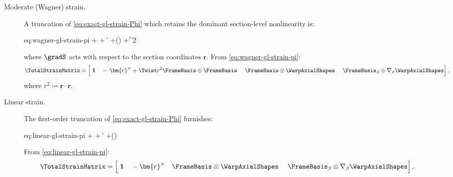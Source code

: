 \begin{description}
\item[Moderate (Wagner) strain.]
A truncation of \eqref{eq:exact-gl-strain-Phi} which retains the dominant section-level nonlinearity is:
\begin{SaveEquation}{eq:wagner-gl-strain-pi}
%
\hat{\StrainVector}\coloneq
\bm{\gamma}
+\bm{\kappa}\times{}
+\FrameBasis\otimes\WarpAxialShapes\,\bm{\alpha}'
+\gradS (\WarpAxialShapes\cdot\bm{\alpha})
+\Twist^2\,
\cdot{}\,\FrameBasis
\end{SaveEquation}
where \(\gradS\) acts with respect to the section coordinates \(\bm{r}\). 
From \eqref{eq:wagner-gl-strain-pi}:
\begin{equation}
\TotalStrainMatrix
=\left[
\;\mathbf{1}
~~~-\,\bm{r}^{\times}+\Twist r^2 \FrameBasis\otimes\FrameBasis
~~~~\FrameBasis\otimes\WarpAxialShapes
~~~~\FrameBasis_{\beta}\otimes\nabla_{\beta}\WarpAxialShapes
\right],
\label{eq:def-section-kinematic-matrix-wagner}
\end{equation}
where \(r^2 \coloneq \bm{r}\cdot\bm{r}\).

\item[Linear strain.]
The first-order truncation of \eqref{eq:exact-gl-strain-Phi} furnishes:
\begin{SaveEquation}{eq:linear-gl-strain-pi}
\hat{\StrainVector}\coloneq
\bm{\gamma}
+\bm{\kappa}\times{}
+\FrameBasis\otimes\WarpAxialShapes\,\bm{\alpha}'
+\gradS (\WarpAxialShapes\cdot\bm{\alpha})
\end{SaveEquation}

From \eqref{eq:linear-gl-strain-pi}:
\begin{equation}
\TotalStrainMatrix
=\left[
\;\mathbf{1}
~~~-\bm{r}^{\times}
~~~\FrameBasis\otimes\WarpAxialShapes
~~~~\FrameBasis_{\beta}\otimes\nabla_{\beta}\WarpAxialShapes
\right],
\label{eq:def-section-kinematic-matrix-Phi}
\end{equation}
\end{description}

